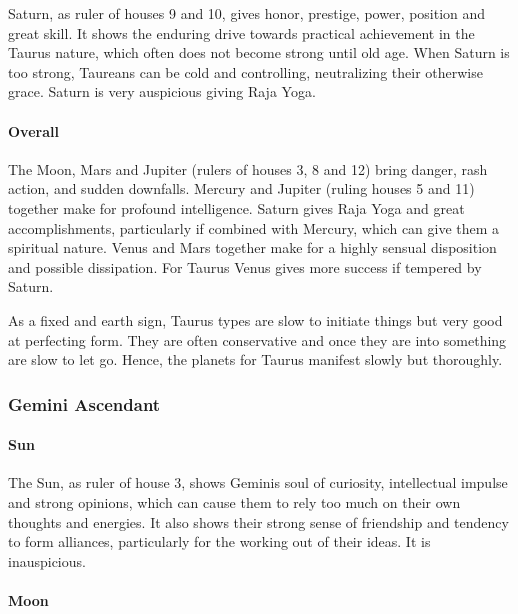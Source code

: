 Saturn, as ruler of houses 9 and 10, gives honor, prestige, power, position and great skill. It shows the enduring drive towards practical achievement in the Taurus nature, which often does not become strong until old age. When Saturn is too strong, Taureans can be cold and controlling, neutralizing their otherwise grace. Saturn is very auspicious giving Raja Yoga.

 

\paragraph{Overall}

The Moon, Mars and Jupiter (rulers of houses 3, 8 and 12) bring danger, rash action, and sudden downfalls. Mercury and Jupiter (ruling houses 5 and 11) together make for profound intelligence. Saturn gives Raja Yoga and great accomplishments, particularly if combined with Mercury, which can give them a spiritual nature. Venus and Mars together make for a highly sensual disposition and possible dissipation. For Taurus Venus gives more success if tempered by Saturn.

 

As a fixed and earth sign, Taurus types are slow to initiate things but very good at perfecting form. They are often conservative and once they are into something are slow to let go. Hence, the planets for Taurus manifest slowly but thoroughly.

 

\subsubsection{Gemini Ascendant}
 

\paragraph{Sun}

The Sun, as ruler of house 3, shows Geminis soul of curiosity, intellectual impulse and strong opinions, which can cause them to rely too much on their own thoughts and energies. It also shows their strong sense of friendship and tendency to form alliances, particularly for the working out of their ideas. It is inauspicious.

 

\paragraph{Moon}

